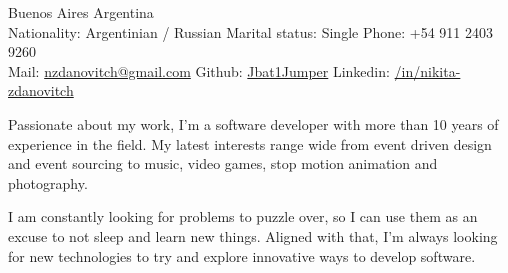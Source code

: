 \documentclass[10pt,a4paper]{article}
\begin{document}
\sloppy




\nobreakvspace{0.3em}

\noindent
Buenos Aires \sbull
Argentina \vspace{3pt} \\
Nationality: Argentinian / Russian \sbull
Marital status: Single \sbull
Phone: +54 911 2403 9260 \vspace{3pt} \\
Mail: \href{mailto:nzdanovitch.at.gmail.dot.com}{nzdanovitch\mbox{}@\mbox{}gmail.com} \sbull
Github: \href{http://github.com/Jbat1Jumper}{Jbat1Jumper} \sbull
Linkedin: \href{https://www.linkedin.com/in/nikita-zdanovitch}{/in/nikita-zdanovitch}


\spacedhrule{1.2em}{-0.4em}  %





\vspace{-1.3em}
\begin{multicols}{2}
\noindent

Passionate about my work, I'm a software developer with more than 10 years of
experience in the field. My latest interests range wide from event driven design
and event sourcing to music, video games, stop motion animation and photography.

I am constantly looking for problems to puzzle over, so I can use them as an
excuse to not sleep and learn new things. Aligned with that, I'm always
looking for new technologies to try and explore innovative ways to develop
software.



% 
% 


%
%

\end{multicols}
\end{document}
